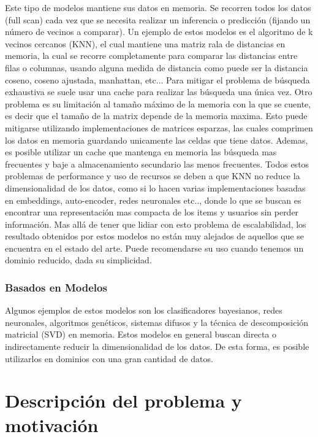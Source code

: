 \documentclass[11pt,a4paper,twoside]{thesis}
\begin{document}
 Este tipo de modelos mantiene sus datos en memoria. Se recorren todos los datos (full scan) cada vez que se necesita realizar un inferencia o predicción (fijando un número de vecinos a comparar). Un ejemplo de estos modelos es el algoritmo de k vecinos cercanos (KNN), el cual mantiene una matriz rala de distancias en memoria, la cual se recorre completamente para comparar las distancias entre filas o columnas, usando alguna medida de distancia como puede ser la distancia coseno, coseno ajustada, manhattan, etc... Para mitigar el problema de búsqueda exhaustiva se suele usar una cache para realizar las búsqueda una única vez. Otro problema es su limitación al tamaño máximo de la memoria con la que se cuente, es decir que el tamaño de la matrix depende de la memoria maxima. Esto puede mitigarse utilizando implementaciones de matrices esparzas, las cuales comprimen los datos en memoria guardando unicamente las celdas que tiene datos. Ademas, es posible utilizar un cache que mantenga en memoria las búsqueda mas frecuentes y baje a almacenamiento secundario las menos frecuentes. Todos estos problemas de performance y uso de recursos se deben a que KNN no reduce la dimensionalidad de los datos, como si lo hacen varias implementaciones basadas en embeddings, auto-encoder, redes neuronales etc.., donde lo que se buscan es encontrar una representación mas compacta de los items y usuarios sin perder información. Mas allá de tener que lidiar con esto problema de escalabilidad, los resultado obtenidos por estos modelos no están muy alejados de aquellos que se encuentra en el estado del arte. Puede recomendarse su uso cuando tenemos un dominio reducido, dada su simplicidad. 

 \subsubsection{Basados en Modelos}
 
Algunos ejemplos de estos modelos son los clasificadores bayesianos, redes neuronales, algoritmos genéticos, sistemas difusos y la técnica de descomposición matricial (SVD) en memoria. Estos modelos en general buscan directa o indirectamente reducir la dimensionalidad de los datos. De esta forma, es posible utilizarlos en dominios con una gran cantidad de datos.

\clearpage
\section{Descripción del problema y motivación}
\end{document}
